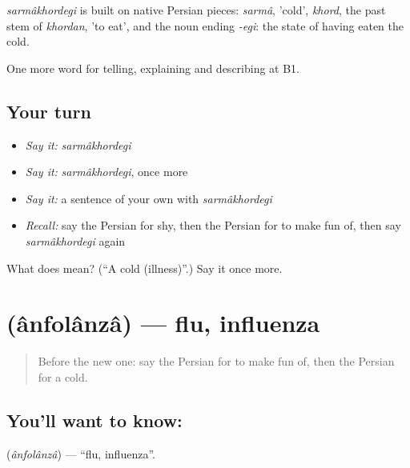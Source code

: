 \begin{cousinweb}
\emph{sarmâkhordegi} is built on native Persian pieces: \emph{sarmâ}, 'cold', \emph{khord}, the past stem of \emph{khordan}, 'to eat', and the noun ending \emph{-egi}: the state of having eaten the cold.
\end{cousinweb}

\begin{grammarlens}[title={What you've built}]
One more word for telling, explaining and describing at B1.
\end{grammarlens}

\subsection*{Your turn}
\begin{itemize}
\raggedright
  \item \emph{Say it:} \emph{sarmâkhordegi}
  \item \emph{Say it:} \emph{sarmâkhordegi}, once more
  \item \emph{Say it:} a sentence of your own with \emph{sarmâkhordegi}
  \item \emph{Recall:} say the Persian for shy, then the Persian for to make fun of, then say \emph{sarmâkhordegi} again
\end{itemize}

\begin{tcolorbox}[breakable,colback=teal!4,colframe=teal!35!black,title={Before you move on}]
What does  mean? (\textquotedblleft{}A cold (illness)\textquotedblright{}.) Say it once more.
\end{tcolorbox}
\section[\texorpdfstring{\fa{آنفولانزا} (ânfolânzâ)}{آنفولانزا (ânfolânzâ)}]{ (ânfolânzâ) — flu, influenza}

\label{lesson:FA-C490-anfolanza}



\begin{quote}
Before the new one: say the Persian for to make fun of, then the Persian for a cold.
\end{quote}

\subsection*{You'll want to know: }
\textbf{} (\emph{ânfolânzâ}) — \textquotedblleft{}flu, influenza\textquotedblright{}.

